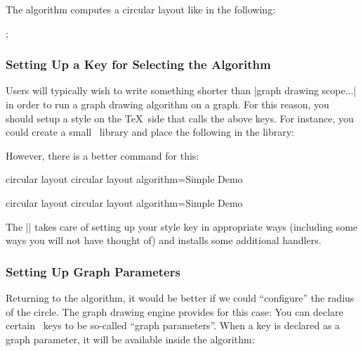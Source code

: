 The algorithm computes a circular layout like in the following:

\begin{codeexample}[]
\tikz [graph drawing scope, /graph drawing/algorithm=Simple Demo]
  ;
\end{codeexample}


\subsubsection{Setting Up a Key for Selecting the Algorithm}

Users will typically wish to write something shorter than
|graph drawing scope...| in order to run a graph drawing algorithm on
a graph. For this reason, you should setup a style on the \TeX\ side
that calls the above keys. For instance, you could create a small
\tikzname\ library and place the following in the library:

\begin{codeexample}
\end{codeexample}

However, there is a better command for this:

\begin{codeexample}[code only]
\pgfgddeclarealgorithmkey
{circular layout}
{circular layout}
{algorithm=Simple Demo}
\end{codeexample}
\pgfgddeclarealgorithmkey
{circular layout}
{circular layout}
{algorithm=Simple Demo}

The |\pgfgddeclarealgorithmkey| takes care of setting up your style
key in appropriate ways (including some ways you will not have thought
of) and installs some additional handlers.


\subsubsection{Setting Up Graph Parameters}

Returning to the algorithm, it would be better if we could
``configure'' the radius of the circle. The graph drawing engine
provides for this case: You can declare certain \pgfname\ keys to be
so-called ``graph parameters''. When a key is declared as a graph
parameter, it will be available inside the algorithm: 

